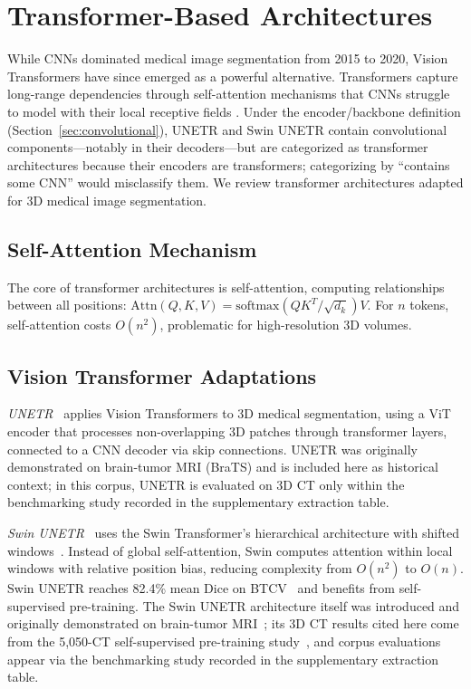 \section{Transformer-Based Architectures}
\label{sec:transformer}

While CNNs dominated medical image segmentation from 2015 to 2020, Vision Transformers have since emerged as a powerful alternative. Transformers capture long-range dependencies through self-attention mechanisms that CNNs struggle to model with their local receptive fields \cite{shamshad2023transformers}. Under the encoder/backbone definition (Section~\ref{sec:convolutional}), UNETR and Swin UNETR contain convolutional components---notably in their decoders---but are categorized as transformer architectures because their encoders are transformers; categorizing by ``contains some CNN'' would misclassify them. We review transformer architectures adapted for 3D medical image segmentation.

\subsection{Self-Attention Mechanism}

The core of transformer architectures is self-attention, computing relationships between all positions: $\text{Attn}(Q,K,V) = \text{softmax}(QK^T/\sqrt{d_k})V$. For $n$ tokens, self-attention costs $O(n^2)$, problematic for high-resolution 3D volumes.

\subsection{Vision Transformer Adaptations}

\emph{UNETR}~\cite{hatamizadeh2022unetr} applies Vision Transformers to 3D medical segmentation, using a ViT encoder that processes non-overlapping 3D patches through transformer layers, connected to a CNN decoder via skip connections. UNETR was originally demonstrated on brain-tumor MRI (BraTS) and is included here as historical context; in this corpus, UNETR is evaluated on 3D CT only within the benchmarking study recorded in the supplementary extraction table.

\emph{Swin UNETR}~\cite{swinunetr2022} uses the Swin Transformer's hierarchical architecture with shifted windows~\cite{liu2021swin}. Instead of global self-attention, Swin computes attention within local windows with relative position bias, reducing complexity from $O(n^2)$ to $O(n)$. Swin UNETR reaches 82.4\% mean Dice on BTCV~\cite{tang2022selfsupervised} and benefits from self-supervised pre-training. The Swin UNETR architecture itself was introduced and originally demonstrated on brain-tumor MRI~\cite{swinunetr2022}; its 3D CT results cited here come from the 5,050-CT self-supervised pre-training study~\cite{tang2022selfsupervised}, and corpus evaluations appear via the benchmarking study recorded in the supplementary extraction table.

